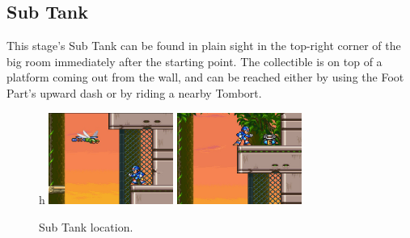 \subsection{Sub Tank}
This stage's Sub Tank can be found in plain sight in the top-right corner of the big room immediately after the starting point. The collectible is on top of a platform coming out from the wall, and can be reached either by using the Foot Part's upward dash or by riding a nearby Tombort.
\begin{figure}[htp]
	\centering
h	\includegraphics[height=3cm]{figures/X3/Neon_tiger/tank_1.jpg}
	\includegraphics[height=3cm]{figures/X3/Neon_tiger/tank_2.jpg}
	\caption{Sub Tank location.}
\end{figure}

